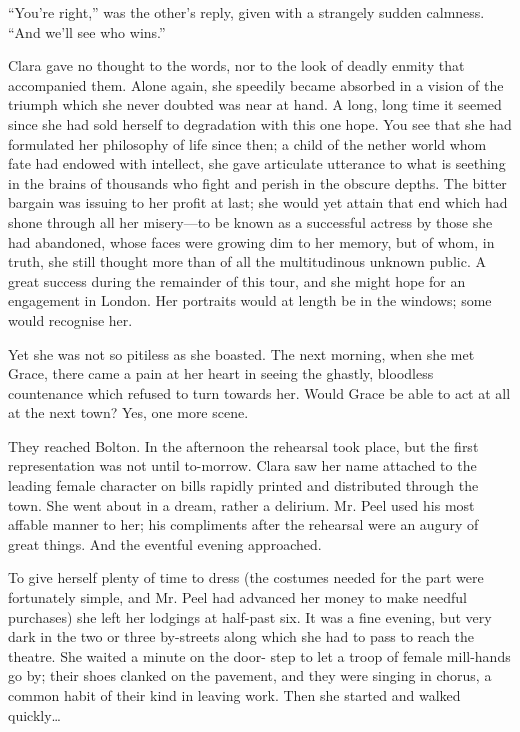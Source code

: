 ``You're right,'' was the other's reply, given with a strangely sudden
calmness. ``And we'll see who wins.''

Clara gave no thought to the words, nor to the look of deadly enmity
that accompanied them. Alone again, she speedily became absorbed in a
vision of the triumph which she never doubted was near at hand. A long,
long time it seemed since she had sold herself to degradation with this
one hope. You see that she had formulated her philosophy of life since
then; a child of the nether world whom fate had endowed with intellect,
she gave articulate utterance to what is seething in the brains of
thousands who fight and perish in the obscure depths. The bitter bargain
was issuing to her profit at last; she would yet attain that end which
had shone through all her misery---to be known as a successful actress
by those she had abandoned, whose faces were growing dim to her memory,
but of whom, in truth, she still {\protect\hypertarget{213}{}{}}thought
more than of all the multitudinous unknown public. A great success
during the remainder of this tour, and she might hope for an engagement
in London. Her portraits would at length be in the windows; some would
recognise her.

Yet she was not so pitiless as she boasted. The next morning, when she
met Grace, there came a pain at her heart in seeing the ghastly,
bloodless countenance which refused to turn towards her. Would Grace be
able to act at all at the next town? Yes, one more scene.

They reached Bolton. In the afternoon the rehearsal took place, but the
first representation was not until to-morrow. Clara saw her name
attached to the leading female character on bills rapidly printed and
distributed through the town. She went about in a dream, rather a
delirium. Mr. Peel used his most affable manner to her; his compliments
after the rehearsal were an augury of great things. And the eventful
evening approached.

{\protect\hypertarget{214}{}{}}To give herself plenty of time to dress
(the costumes needed for the part were fortunately simple, and Mr. Peel
had advanced her money to make needful purchases) she left her lodgings
at half-past six. It was a fine evening, but very dark in the two or
three by-streets along which she had to pass to reach the theatre. She
waited a minute on the door- step to let a troop of female mill-hands go
by; their shoes clanked on the pavement, and they were singing in
chorus, a common habit of their kind in leaving work. Then she started
and walked quickly\ldots{}

